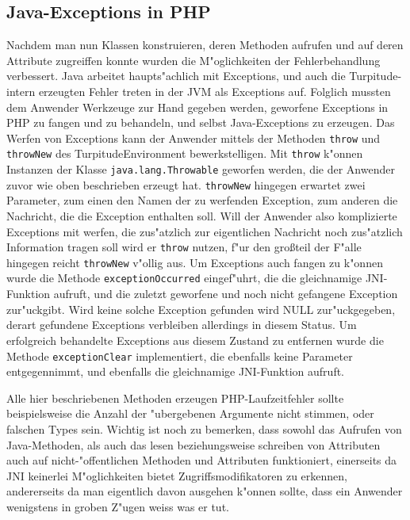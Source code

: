 \subsection{Java-Exceptions in PHP}
\label{sec:chap1:impl:8}

Nachdem man nun Klassen konstruieren, deren Methoden aufrufen und auf deren Attribute zugreiffen konnte wurden die M"oglichkeiten der Fehlerbehandlung
verbessert. Java arbeitet haupts"achlich mit Exceptions, und auch die Turpitude-intern erzeugten Fehler treten in der JVM als Exceptions auf. Folglich mussten dem
Anwender Werkzeuge zur Hand gegeben werden, geworfene Exceptions in PHP zu fangen und zu behandeln, und selbst Java-Exceptions zu erzeugen. Das Werfen von
Exceptions kann der Anwender mittels der Methoden \texttt{throw} und \texttt{throwNew} des TurpitudeEnvironment bewerkstelligen. Mit \texttt{throw} k"onnen Instanzen
der Klasse \texttt{java.lang.Throwable} geworfen werden, die der Anwender zuvor wie oben beschrieben erzeugt hat. \texttt{throwNew} hingegen erwartet zwei Parameter,
zum einen den Namen der zu werfenden Exception, zum anderen die Nachricht, die die Exception enthalten soll. Will der Anwender also komplizierte Exceptions mit
werfen, die zus"atzlich zur eigentlichen Nachricht noch zus"atzlich Information tragen soll wird er \texttt{throw} nutzen, f"ur den gro\ss teil der F"alle 
hingegen reicht \texttt{throwNew} v"ollig aus. Um Exceptions auch fangen zu k"onnen wurde die Methode \texttt{exceptionOccurred} eingef"uhrt, die die gleichnamige
JNI-Funktion aufruft, und die zuletzt geworfene und noch nicht gefangene Exception zur"uckgibt. Wird keine solche Exception gefunden wird NULL zur"uckgegeben,
derart gefundene Exceptions verbleiben allerdings in diesem Status. Um erfolgreich behandelte Exceptions aus diesem Zustand zu entfernen wurde die Methode
\texttt{exceptionClear} implementiert, die ebenfalls keine Parameter entgegennimmt, und ebenfalls die gleichnamige JNI-Funktion aufruft.

Alle hier beschriebenen Methoden erzeugen PHP-Laufzeitfehler sollte beispielsweise die Anzahl der "ubergebenen Argumente nicht stimmen, oder falschen Types sein.
Wichtig ist noch zu bemerken, dass sowohl das Aufrufen von Java-Methoden, als auch das lesen beziehungsweise schreiben von Attributen auch auf nicht-"offentlichen
Methoden und Attributen funktioniert, einerseits da JNI keinerlei M"oglichkeiten bietet Zugriffsmodifikatoren zu erkennen, andererseits da man eigentlich davon
ausgehen k"onnen sollte, dass ein Anwender wenigstens in groben Z"ugen weiss was er tut. 

